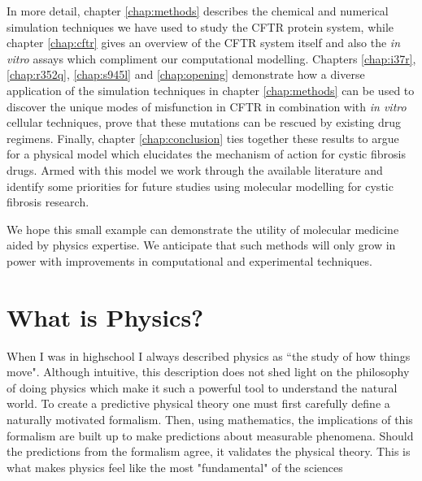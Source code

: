 In more detail, chapter \ref{chap:methods} describes the chemical and numerical simulation techniques we have used to study the CFTR protein system, while chapter \ref{chap:cftr} gives an overview of the CFTR system itself and also the \textit {in vitro} assays which compliment our computational modelling.  Chapters \ref{chap:i37r}, \ref{chap:r352q}, \ref{chap:s945l} and \ref{chap:opening} demonstrate how a diverse application of the simulation techniques in chapter \ref{chap:methods} can be used to discover the unique modes of misfunction in CFTR in combination with \textit {in vitro} cellular techniques, prove that these mutations can be rescued by existing drug regimens. Finally, chapter \ref{chap:conclusion} ties together these results to argue for a physical model which elucidates the mechanism of action for cystic fibrosis drugs. Armed with this model we work through the available literature and identify some priorities for future studies using molecular modelling for cystic fibrosis research.

We hope this small example can demonstrate the utility of molecular medicine aided by physics expertise. We anticipate that such methods will only grow in power with improvements in computational and experimental techniques.

\section{What is Physics?}
When I was in highschool I always described physics as ``the study of how things move". Although intuitive, this description does not shed light on the philosophy of doing physics which make it such a powerful tool to understand the natural world. To create a predictive physical theory one must first carefully define a naturally motivated formalism. Then, using mathematics, the implications of this formalism are built up to make predictions about measurable phenomena. Should the predictions from the formalism agree, it validates the physical theory. This is what makes physics feel like the most "fundamental" of the sciences

